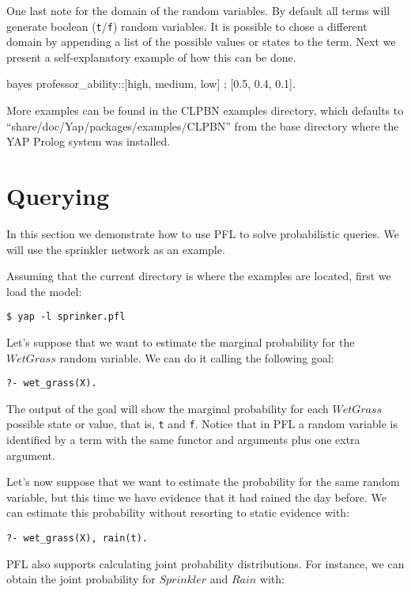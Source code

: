 \documentclass{article}
\begin{document}
One last note for the domain of the random variables. By default all terms will generate boolean (\texttt{t}/\texttt{f}) random variables. It is possible to chose a different domain by appending a list of the possible values or states to the term. Next we present a self-explanatory example of how this can be done.

\begin{pflcode}
bayes professor_ability::[high, medium, low] ; [0.5, 0.4, 0.1].
\end{pflcode}

More examples can be found in the CLPBN examples directory, which defaults to ``share/doc/Yap/packages/examples/CLPBN'' from the base directory where the YAP Prolog system was installed.

\section{Querying}
In this section we demonstrate how to use PFL to solve probabilistic queries. We will use the sprinkler network as an example.

Assuming that the current directory is where the examples are located, first we load the model:

\texttt{\$ yap -l sprinker.pfl}

Let's suppose that we want to estimate the marginal probability for the $WetGrass$ random variable. We can do it calling the following goal:

\texttt{?- wet\_grass(X).}

The output of the goal will show the marginal probability for each $WetGrass$ possible state or value, that is, \texttt{t} and \texttt{f}. Notice that in PFL a random variable is identified by a term with the same functor and arguments plus one extra argument.

Let's now suppose that we want to estimate the probability for the same random variable, but this time we have evidence that it had rained the day before. We can estimate this probability without resorting to static evidence with:

\texttt{?- wet\_grass(X), rain(t).}

PFL also supports calculating joint probability distributions. For instance, we can obtain the joint probability for $Sprinkler$ and $Rain$ with:
\end{document}

